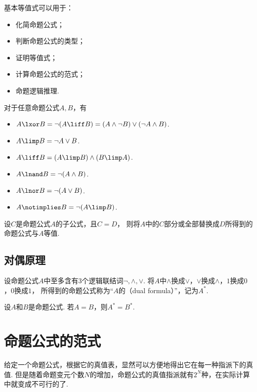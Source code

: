 \begin{remark}
基本等值式可以用于：\begin{itemize}
	\item 化简命题公式；
	\item 判断命题公式的类型；
	\item 证明等值式；
	\item 计算命题公式的范式；
	\item 命题逻辑推理.
\end{itemize}
\end{remark}

对于任意命题公式\(A,B\)，有\begin{itemize}
	\item \(A \lxor B
	= \neg(A \liff B)
	= (A \land \neg B) \lor (\neg A \land B)\).
	\item \(A \limp B
	= \neg A \lor B\).
	\item \(A \liff B
	= (A \limp B) \land (B \limp A)\).
	\item \(A \lnand B
	= \neg(A \land B)\).
	\item \(A \lnor B
	= \neg(A \lor B)\).
	\item \(A \notimplies B
	= \neg(A \limp B)\).
\end{itemize}

\begin{theorem}[等值置换定理]
设\(C\)是命题公式\(A\)的子公式，且\(C = D\)，
则将\(A\)中的\(C\)部分或全部替换成\(D\)所得到的命题公式与\(A\)等值.
\end{theorem}

\subsection{对偶原理}
\begin{definition}
设命题公式\(A\)中至多含有3个逻辑联结词\(\neg,\land,\lor\).
将\(A\)中\(\land\)换成\(\lor\)，\(\lor\)换成\(\land\)，\(1\)换成\(0\)，\(0\)换成\(1\)，
所得到的命题公式称为“\(A\)的（dual formula）”，记为\(A^*\).
\end{definition}

\begin{theorem}[对偶原理]
设\(A\)和\(B\)是命题公式.
若\(A = B\)，则\(A^* = B^*\).
\end{theorem}

\section{命题公式的范式}
给定一个命题公式，根据它的真值表，显然可以方便地得出它在每一种指派下的真值.
但是随着命题变元个数\(N\)的增加，命题公式的真值指派就有\(2^N\)种，在实际计算中就变成不可行的了.

